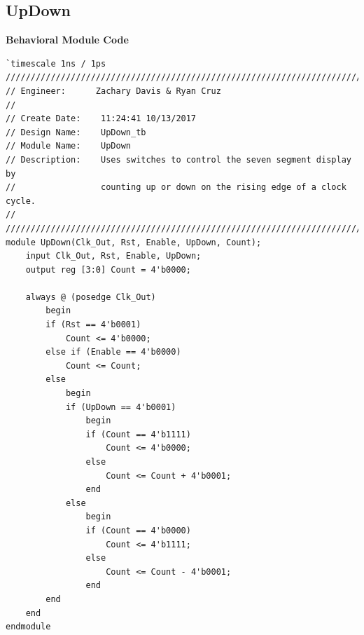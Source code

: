 \documentclass[12pt]{report}
\begin{document}
	\subsection*{UpDown}
		\textbf{Behavioral Module Code}
		\begin{Verbatim}[frame=single, fontsize=\small]
`timescale 1ns / 1ps
////////////////////////////////////////////////////////////////////////////////
// Engineer:      Zachary Davis & Ryan Cruz
// 
// Create Date:    11:24:41 10/13/2017 
// Design Name:    UpDown_tb
// Module Name:    UpDown  
// Description:    Uses switches to control the seven segment display by 
//                 counting up or down on the rising edge of a clock cycle.
//						 
////////////////////////////////////////////////////////////////////////////////
module UpDown(Clk_Out, Rst, Enable, UpDown, Count);
	input Clk_Out, Rst, Enable, UpDown;
	output reg [3:0] Count = 4'b0000;
	
	always @ (posedge Clk_Out)
		begin
		if (Rst == 4'b0001)
			Count <= 4'b0000;
		else if (Enable == 4'b0000)
			Count <= Count;
		else
			begin
			if (UpDown == 4'b0001)
				begin
				if (Count == 4'b1111)
					Count <= 4'b0000;
				else
					Count <= Count + 4'b0001;
				end
			else
				begin
				if (Count == 4'b0000)
					Count <= 4'b1111;
				else
					Count <= Count - 4'b0001;
				end
		end
	end
endmodule
		\end{Verbatim}
\end{document}
